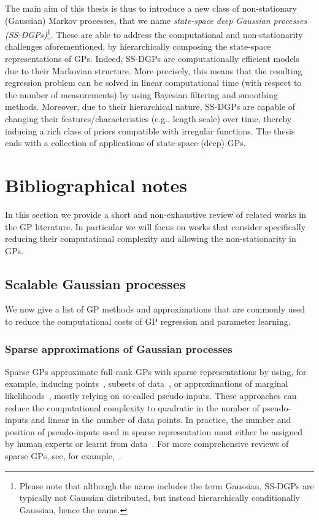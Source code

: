 The main aim of this thesis is thus to introduce a new class of non-stationary (Gaussian) Markov processes, that we name \textit{state-space deep Gaussian processes (SS-DGPs)}\footnote{Please note that although the name includes the term Gaussian, SS-DGPs are typically not Gaussian distributed, but instead hierarchically conditionally Gaussian, hence the name.}. These are able to address the computational and non-stationarity challenges aforementioned, by hierarchically composing the state-space representations of GPs. Indeed, SS-DGPs are computationally efficient models due to their Markovian structure. More precisely, this means that the resulting regression problem can be solved in linear computational time (with respect to the number of measurements) by using Bayesian filtering and smoothing methods. Moreover, due to their hierarchical nature, SS-DGPs are capable of changing their features/characteristics (e.g., length scale) over time, thereby inducing a rich class of priors compatible with irregular functions. The thesis ends with a collection of applications of state-space (deep) GPs.

\section{Bibliographical notes}
\label{sec:literature-review}
In this section we provide a short and non-exhaustive review of related works in the GP literature. In particular we will focus on works that consider specifically reducing their computational complexity and allowing the non-stationarity in GPs.

\subsection*{Scalable Gaussian processes}
We now give a list of GP methods and approximations that are commonly used to reduce the computational costs of GP regression and parameter learning.

\subsubsection{Sparse approximations of Gaussian processes}
Sparse GPs approximate full-rank GPs with sparse representations by using, for example, inducing points~\citep{Snelson2006}, subsets of data~\citep{Snelson2007, Csato2002}, or approximations of marginal likelihoods~\citep{Titsias2009}, mostly relying on so-called pseudo-inputs. These approaches can reduce the computational complexity to quadratic in the number of pseudo-inputs and linear in the number of data points. In practice, the number and position of pseudo-inputs used in sparse representation must either be assigned by human experts or learnt from data~\citep{Hensman2013}. For more comprehensive reviews of sparse GPs, see, for example,~\citet{Quinonero2005unifying, Chalupka2013, LiuHaitao2020}.

